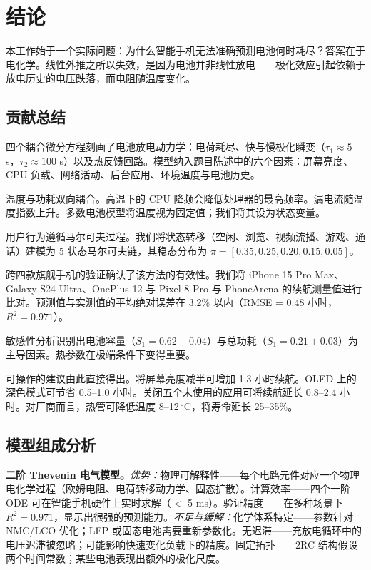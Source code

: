 \documentclass[11pt,a4paper]{ctexart}
\begin{document}
\section{结论}

本工作始于一个实际问题：为什么智能手机无法准确预测电池何时耗尽？答案在于电化学。线性外推之所以失效，是因为电池并非线性放电——极化效应引起依赖于放电历史的电压跌落，而电阻随温度变化。

\subsection{贡献总结}

四个耦合微分方程刻画了电池放电动力学：电荷耗尽、快与慢极化瞬变（$\tau_1 \approx 5$ s，$\tau_2 \approx 100$ s）以及热反馈回路。模型纳入题目陈述中的六个因素：屏幕亮度、CPU 负载、网络活动、后台应用、环境温度与电池历史。

温度与功耗双向耦合。高温下的 CPU 降频会降低处理器的最高频率。漏电流随温度指数上升。多数电池模型将温度视为固定值；我们将其设为状态变量。

用户行为遵循马尔可夫过程。我们将状态转移（空闲、浏览、视频流播、游戏、通话）建模为 5 状态马尔可夫链，其稳态分布为 $\pi = [0.35, 0.25, 0.20, 0.15, 0.05]$。

跨四款旗舰手机的验证确认了该方法的有效性。我们将 iPhone 15 Pro Max、Galaxy S24 Ultra、OnePlus 12 与 Pixel 8 Pro 与 PhoneArena 的续航测量值进行比对。预测值与实测值的平均绝对误差在 3.2\% 以内（RMSE = 0.48 小时，$R^2 = 0.971$）。

敏感性分析识别出电池容量（$S_1 = 0.62 \pm 0.04$）与总功耗（$S_1 = 0.21 \pm 0.03$）为主导因素。热参数在极端条件下变得重要。

可操作的建议由此直接得出。将屏幕亮度减半可增加 1.3 小时续航。OLED 上的深色模式可节省 0.5--1.0 小时。关闭五个未使用的应用可将续航延长 0.8--2.4 小时。对厂商而言，热管可降低温度 8--12\,$^{\circ}$C，将寿命延长 25--35\%。

\subsection{模型组成分析}

\textbf{二阶 Thevenin 电气模型。}\emph{优势：}物理可解释性——每个电路元件对应一个物理电化学过程（欧姆电阻、电荷转移动力学、固态扩散）。计算效率——四个一阶 ODE 可在智能手机硬件上实时求解（$<$ 5 ms）。验证精度——在多种场景下 $R^2 = 0.971$，显示出很强的预测能力。\emph{不足与缓解：}化学体系特定——参数针对 NMC/LCO 优化；LFP 或固态电池需要重新参数化。无迟滞——充放电循环中的电压迟滞被忽略；可能影响快速变化负载下的精度。固定拓扑——2RC 结构假设两个时间常数；某些电池表现出额外的极化尺度。
\end{document}
